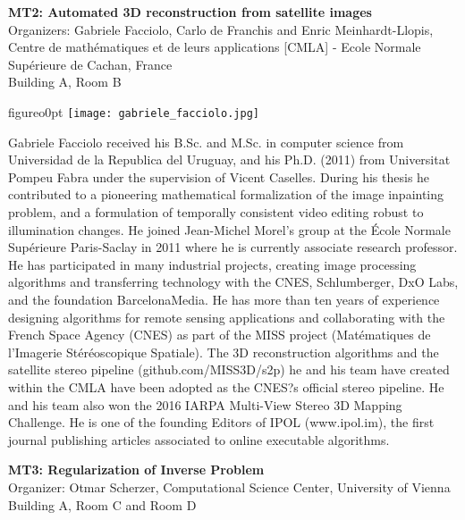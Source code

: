 \vspace{2cm}
\begin{center}
\textbf{MT2: Automated 3D reconstruction from satellite images}\\
Organizers: Gabriele Facciolo, Carlo de Franchis and Enric Meinhardt-Llopis, Centre de math\'ematiques et de leurs applications [CMLA] - Ecole Normale Sup\'erieure de Cachan, France\\
Building A, Room B
\end{center}

\vspace{2cm}
\begin{wrapfloat}{figure}{o}{0pt}
\texttt{[image: gabriele\_facciolo.jpg]}
\end{wrapfloat}
Gabriele Facciolo received his B.Sc. and M.Sc. in computer science from Universidad de la Republica del Uruguay, and his Ph.D. (2011) from Universitat Pompeu Fabra under the supervision of Vicent Caselles. During his thesis he contributed to a pioneering mathematical formalization of the image inpainting problem, and a formulation of temporally consistent video editing robust to illumination changes. He joined Jean-Michel Morel's group at the \'{E}cole Normale Sup\'erieure Paris-Saclay in 2011 where he is currently associate research professor. He has participated in many industrial projects, creating image processing algorithms and transferring technology with the CNES, Schlumberger, DxO Labs, and the foundation BarcelonaMedia. He has more than ten years of experience designing algorithms for remote sensing applications and collaborating with the French Space Agency (CNES) as part of the MISS project (Mat\'ematiques de l'Imagerie St\'er\'eoscopique Spatiale). The 3D reconstruction algorithms and the satellite stereo pipeline (github.com/MISS3D/s2p) he and his team have created within the CMLA have been adopted as the CNES?s official stereo pipeline. He and his team also won the 2016 IARPA Multi-View Stereo 3D Mapping Challenge. He is one of the founding Editors of IPOL (www.ipol.im), the first journal publishing articles associated to online executable algorithms.
\newpage
\vspace{2cm}
\begin{center}
\textbf{MT3: Regularization of Inverse Problem}\\
Organizer: Otmar Scherzer, Computational Science Center, University of Vienna\\
Building A, Room C and Room D
\end{center}


